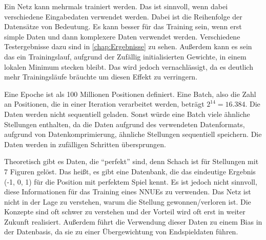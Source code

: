 Ein Netz kann mehrmals trainiert werden. Das ist sinnvoll, wenn dabei verschiedene Eingabedaten verwendet werden. Dabei ist die Reihenfolge der Datensätze von Bedeutung. Es kann besser für das Training sein, wenn erst simple Daten und dann komplexere Daten verwendet werden. Verschiedene Testergebnisse dazu sind in \autoref{chap:Ergebnisse} zu sehen. Außerdem kann es sein das ein Trainingslauf, aufgrund der Zufällig initialisierten Gewichte, in einem lokalen Minimum stecken bleibt. Das wird jedoch vernachlässigt, da es deutlich mehr Trainingsläufe bräuchte um diesen Effekt zu verringern.

Eine Epoche ist als 100 Millionen Positionen definiert. Eine Batch, also die Zahl an Positionen, die in einer Iteration verarbeitet werden, beträgt $2^{14}=16.384$. Die Daten werden nicht sequentiell geladen. Sonst würde eine Batch viele ähnliche Stellungen enthalten, da die Daten aufgrund des verwendeten Datenformats, aufgrund von Datenkomprimierung, ähnliche Stellungen sequentiell speichern. Die Daten werden in zufälligen Schritten übersprungen.




Theoretisch gibt es Daten, die \enquote{perfekt} sind, denn Schach ist für Stellungen mit 7 Figuren gelöst. Das heißt, es gibt eine Datenbank, die das eindeutige Ergebnis (-1, 0, 1) für die Position mit perfektem Spiel kennt. Es ist jedoch nicht sinnvoll, diese Informationen für das Training eines \acp{NNUE} zu verwenden. Das Netz ist nicht in der Lage zu verstehen, warum die Stellung gewonnen/verloren ist. Die Konzepte sind oft schwer zu verstehen und der Vorteil wird oft erst in weiter Zukunft realisiert. Außerdem führt die Verwendung dieser Daten zu einem Bias in der Datenbasis, da sie zu einer Übergewichtung von Endspieldaten führen.


